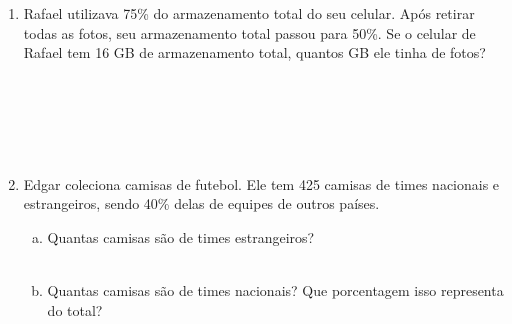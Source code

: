 \documentclass[a4paper,14pt]{article}
\begin{document}
\begin{multicols}{2}
\begin{enumerate}
\begin{enumerate}[a)]
			\end{enumerate}
			\item Rafael utilizava 75\% do armazenamento total do seu celular. Após retirar todas as fotos, seu armazenamento total passou para 50\%. Se o celular de Rafael tem 16 GB de armazenamento total, quantos GB ele tinha de fotos? \\\\\\\\\\\\
			\item Edgar coleciona camisas de futebol. Ele tem 425 camisas de times nacionais e estrangeiros, sendo 40\% delas de equipes de outros países.
			\begin{enumerate}[a)]
				\item Quantas camisas são de times estrangeiros? \\\\
				\item Quantas camisas são de times nacionais? Que porcentagem isso representa do total? \\\\
			\end{enumerate}
    	\end{enumerate}
    \end{multicols}
\end{document}
